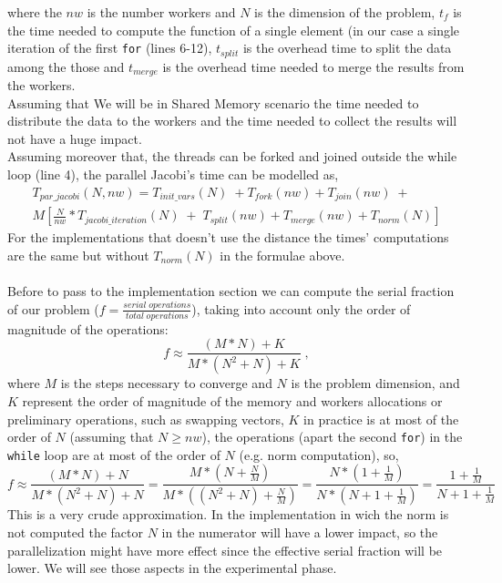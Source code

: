 \documentclass[12pt]{extarticle}
\begin{document}
where the $nw$ is the number workers and $N$ is the dimension of the problem, $t_f$ is the time needed to compute the function of a single element (in our case a single iteration of the first \texttt{for} (lines 6-12), $t_{split}$ is the overhead time to split the data among the those and $t_{merge}$ is the overhead time needed to merge the results from the workers.\\
Assuming that We will be in Shared Memory scenario the time needed to distribute the data to the workers and the time needed to collect the results will not have a huge impact.\\
Assuming moreover that, the threads can be forked and joined outside the while loop (line 4), the parallel Jacobi's time can be modelled as,
\begin{equation*}
\begin{aligned}
T_{par\_jacobi}(N, nw) = T_{init\_vars}(N) \; + T_{fork}(nw) + T_{join}(nw) \; + \\ M[\frac{N}{nw}*T_{jacobi\_iteration}(N) \; + \; T_{split}(nw) + T_{merge}(nw) + T_{norm}(N)]
\end{aligned}
\end{equation*}
For the implementations that doesn't use the distance the times' computations are the same but without $T_{norm}(N)$ in the formulae above.\\\\
Before to pass to the implementation section we can compute the serial fraction of our problem ($f = \frac{serial \; operations}{total \; operations}$), taking into account only the order of magnitude of the operations:
\[f \approx \frac{(M*N) + K}{M*(N^2 + N) + K} \; ,\]
where $M$ is the steps necessary to converge and $N$ is the problem dimension, and $K$ represent the order of magnitude of the memory and workers allocations or preliminary operations, such as swapping vectors, $K$ in practice is at most of the order of $N$ (assuming that $N \geq nw$), the operations (apart the second \texttt{for}) in the \texttt{while} loop are at most of the order of $N$ (e.g. norm computation), so,
\[f \approx \frac{(M*N) + N}{M*(N^2 + N) + N} = \frac{M*(N + \frac{N}{M})}{M*((N^2 + N) + \frac{N}{M})} = \frac{N*(1 + \frac{1}{M})}{N*(N + 1 + \frac{1}{M})} = \frac{1 + \frac{1}{M}}{N + 1 + \frac{1}{M}}\]
This is a very crude approximation. In the implementation in wich the norm is not computed the factor $N$ in the numerator will have a lower impact, so the parallelization might have more effect since the effective serial fraction will be lower. We will see those aspects in the experimental phase.\\
\end{document}
